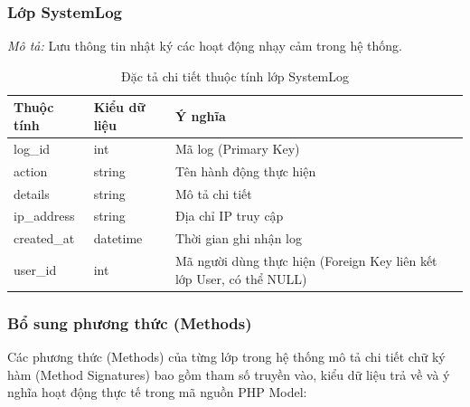 \subsubsection{Lớp SystemLog}
\textit{Mô tả:} Lưu thông tin nhật ký các hoạt động nhạy cảm trong hệ thống.

\begin{table}[H]
\centering
\renewcommand{\arraystretch}{1.3}
\begin{tabularx}{\textwidth}{|p{4cm}|p{3cm}|>{\raggedright\arraybackslash}X|}
\hline
\rowcolor{tableheader}
\textbf{Thuộc tính} & \textbf{Kiểu dữ liệu} & \textbf{Ý nghĩa} \\ \hline
log\_id & int & Mã log (Primary Key) \\ \hline
action & string & Tên hành động thực hiện \\ \hline
details & string & Mô tả chi tiết \\ \hline
ip\_address & string & Địa chỉ IP truy cập \\ \hline
created\_at & datetime & Thời gian ghi nhận log \\ \hline
user\_id & int & Mã người dùng thực hiện (Foreign Key liên kết lớp User, có thể NULL) \\ \hline
\end{tabularx}
\caption{Đặc tả chi tiết thuộc tính lớp SystemLog}
\label{tab:class_systemlog}
\end{table}


\subsubsection{Bổ sung phương thức (Methods)}
\label{subsubsec:class_methods}

Các phương thức (Methods) của từng lớp trong hệ thống mô tả chi tiết chữ ký hàm (Method Signatures) bao gồm tham số truyền vào, kiểu dữ liệu trả về và ý nghĩa hoạt động thực tế trong mã nguồn PHP Model:


